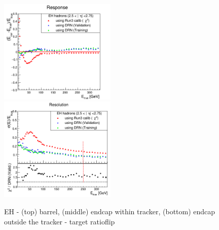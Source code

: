 \begin{figure}
\includegraphics[width=0.495\textwidth]{./plots_pdf/HCAL_plots/Trained_target_ratioflip_0_500_10/pdf/EH_ec_out/EC_outside_tracker_corrEtaEndcapEcalHcal.png}
\includegraphics[width=0.495\textwidth]{./plots_pdf/HCAL_plots/Trained_target_ratioflip_0_500_10/pdf/EH_ec_out/EC_outside_tracker_corrEtaEndcapEcalHcal_reso.png}
\caption{EH - (top) barrel, (middle) endcap within tracker, (bottom) endcap outside the tracker - target ratioflip}
\label{fig:EH_ratioflip}
\end{figure}
